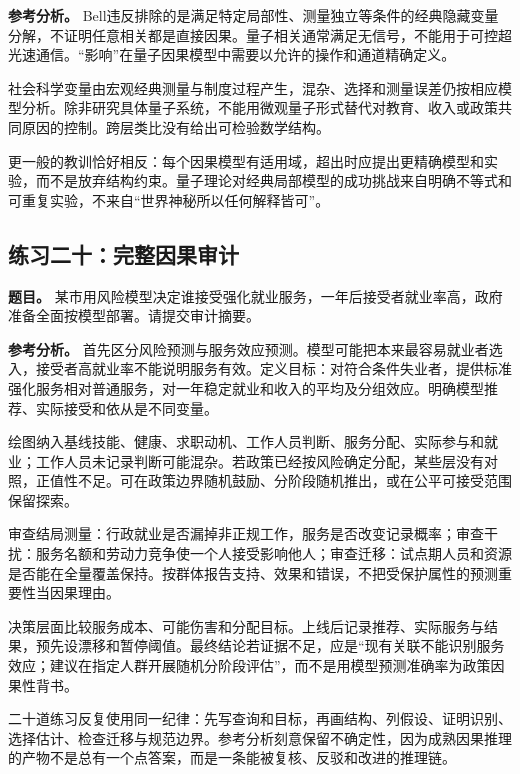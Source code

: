 \textbf{参考分析。} Bell违反排除的是满足特定局部性、测量独立等条件的经典隐藏变量分解，不证明任意相关都是直接因果。量子相关通常满足无信号，不能用于可控超光速通信。“影响”在量子因果模型中需要以允许的操作和通道精确定义。

社会科学变量由宏观经典测量与制度过程产生，混杂、选择和测量误差仍按相应模型分析。除非研究具体量子系统，不能用微观量子形式替代对教育、收入或政策共同原因的控制。跨层类比没有给出可检验数学结构。

更一般的教训恰好相反：每个因果模型有适用域，超出时应提出更精确模型和实验，而不是放弃结构约束。量子理论对经典局部模型的成功挑战来自明确不等式和可重复实验，不来自“世界神秘所以任何解释皆可”。

\subsection*{练习二十：完整因果审计}

\textbf{题目。} 某市用风险模型决定谁接受强化就业服务，一年后接受者就业率高，政府准备全面按模型部署。请提交审计摘要。

\textbf{参考分析。} 首先区分风险预测与服务效应预测。模型可能把本来最容易就业者选入，接受者高就业率不能说明服务有效。定义目标：对符合条件失业者，提供标准强化服务相对普通服务，对一年稳定就业和收入的平均及分组效应。明确模型推荐、实际接受和依从是不同变量。

绘图纳入基线技能、健康、求职动机、工作人员判断、服务分配、实际参与和就业；工作人员未记录判断可能混杂。若政策已经按风险确定分配，某些层没有对照，正值性不足。可在政策边界随机鼓励、分阶段随机推出，或在公平可接受范围保留探索。

审查结局测量：行政就业是否漏掉非正规工作，服务是否改变记录概率；审查干扰：服务名额和劳动力竞争使一个人接受影响他人；审查迁移：试点期人员和资源是否能在全量覆盖保持。按群体报告支持、效果和错误，不把受保护属性的预测重要性当因果理由。

决策层面比较服务成本、可能伤害和分配目标。上线后记录推荐、实际服务与结果，预先设漂移和暂停阈值。最终结论若证据不足，应是“现有关联不能识别服务效应；建议在指定人群开展随机分阶段评估”，而不是用模型预测准确率为政策因果性背书。

\begin{chapterreview}
二十道练习反复使用同一纪律：先写查询和目标，再画结构、列假设、证明识别、选择估计、检查迁移与规范边界。参考分析刻意保留不确定性，因为成熟因果推理的产物不是总有一个点答案，而是一条能被复核、反驳和改进的推理链。
\end{chapterreview}
